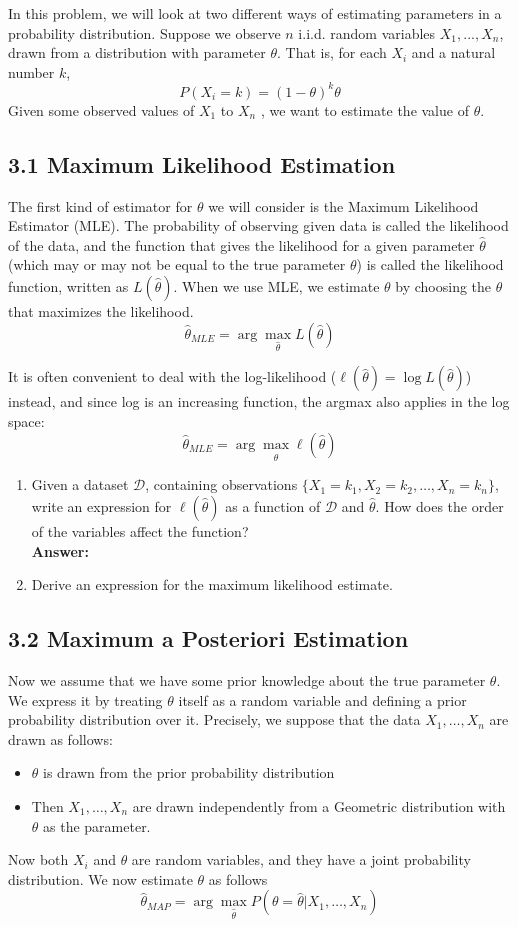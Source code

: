 \documentclass{article}
\begin{document}
In this problem, we will look at two different ways of estimating parameters in a probability distribution. Suppose we observe $n$ i.i.d. random variables $X_1,...,X_n$, drawn from a distribution with parameter $\theta$. That is, for each $X_i$ and a natural number $k$,
$$P(X_i=k)=(1-\theta)^k\theta$$
Given some observed values of $X_1$ to $X_n$ , we want to estimate the value of $\theta$.

\subsection*{3.1 Maximum Likelihood Estimation}

The first kind of estimator for $\theta$ we will consider is the Maximum Likelihood Estimator (MLE). The probability of observing given data is called the likelihood of the data, and the function that gives the likelihood for a given parameter $\hat{\theta}$ (which may or may not be equal to the true parameter $\theta$) is called the likelihood function, written as $L(\hat{\theta})$. When we use MLE, we estimate $\theta$ by choosing the $\hat{\theta}$ that maximizes the likelihood.
$$\hat{\theta}_{MLE}=\arg\max_{\hat{\theta}}L(\hat{\theta})$$

It is often convenient to deal with the log-likelihood ($\ell(\hat{\theta})=\log L(\hat{\theta})$) instead, and since log is an increasing function, the argmax also applies in the log space:
$$\hat{\theta}_{MLE}=\arg\max_{\hat{\theta}}\ell(\hat{\theta})$$

\begin{enumerate}
	\item Given a dataset $\mathcal{D}$, containing observations $\{X_1=k_1,X_2=k_2,\dots,X_n=k_n\}$, write an expression for $\ell(\hat{\theta})$ as a function of $\mathcal{D}$ and $\hat{\theta}$. How does the order of the variables affect the function?
	\\\textbf{Answer:}
	
	\item Derive an expression for the maximum likelihood estimate.
\end{enumerate}

\subsection*{3.2 Maximum a Posteriori Estimation}

Now we assume that we have some prior knowledge about the true parameter $\theta$. We express it by treating $\theta$ itself as a random variable and defining a prior probability distribution over it. Precisely, we suppose that the data $X_1,\dots,X_n$ are drawn as follows:
\begin{itemize}
	\item $\theta$ is drawn from the prior probability distribution
	\item Then $X_1,\dots,X_n$ are drawn independently from a Geometric distribution with $\theta$ as the parameter.
\end{itemize}
Now both $X_i$ and $\theta$ are random variables, and they have a joint probability distribution. We now estimate $\theta$ as follows
$$\hat{\theta}_{MAP}=\arg\max_{\hat{\theta}}P(\theta=\hat{\theta}|X_1,\dots,X_n)$$
\end{document}
